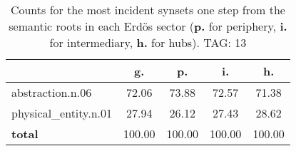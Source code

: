 \begin{table}[h!]
\begin{center}
\begin{tabular}{| l | c | c | c | c |}\hline
 & g. & p. & i. & h. \\\hline
abstraction.n.06 & 72.06  & 73.88  & 72.57  & 71.38 \\\hline
physical\_entity.n.01 & 27.94  & 26.12  & 27.43  & 28.62 \\\hline
{{\bf total}} & 100.00  & 100.00  & 100.00  & 100.00 \\\hline
\end{tabular}
\caption{Counts for the most incident synsets one step from the semantic roots in each Erd\"os sector ({\bf p.} for periphery, {\bf i.} for intermediary, {\bf h.} for hubs). TAG: 13}
\end{center}
\end{table}